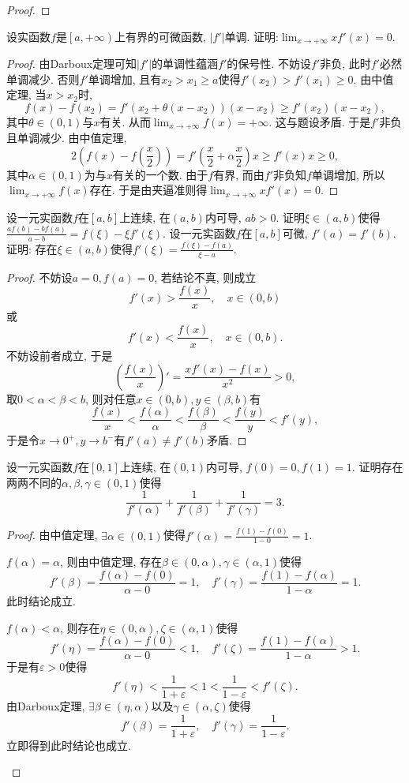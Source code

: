 \begin{quiza}
\begin{proof}
\end{proof}
\woe 设实函数\(f\)是\(\left[a,+\infty\right)\)上有界的可微函数, \(|f'|\)单调. 证明:\(\lim_{x\rightarrow+\infty}xf'(x)=0.\)
\begin{proof}
由Darboux定理可知\(|f'|\)的单调性蕴涵\(f'\)的保号性. 不妨设\(f'\)非负, 此时\(f'\)必然单调减少. 否则\(f'\)单调增加, 且有\(x_2>x_1\geqslant a\)使得\(f'(x_2)>f'(x_1)\geqslant 0\). 由中值定理, 当\(x>x_2\)时,\[f(x)-f(x_2)=f'\left(x_2+\theta (x-x_2)\right)(x-x_2)\geqslant f'(x_2)(x-x_2),\]其中\(\theta\in(0,1)\)与\(x\)有关. 从而\(\lim_{x\rightarrow+\infty}f(x)=+\infty\). 这与题设矛盾. 于是\(f'\)非负且单调减少. 由中值定理,\[2\left(f(x)-f\left(\frac{x}{2}\right)\right)=f'\left(\frac{x}{2}+\alpha\frac{x}{2}\right)x\geqslant f'(x)x\geqslant 0,\]其中\(\alpha\in(0,1)\)为与\(x\)有关的一个数. 由于\(f\)有界, 而由\(f'\)非负知\(f\)单调增加, 所以\(\lim_{x\rightarrow+\infty}f(x)\)存在. 于是由夹逼准则得\(\lim_{x\rightarrow+\infty}xf'(x)=0.\)
\end{proof}
\woe 设一元实函数\(f\)在\([a,b]\)上连续, 在\((a,b)\)内可导, \(ab>0\). 证明\(\xi\in (a,b)\)使得\(\frac{af(b)-bf(a)}{a-b}=f(\xi)-\xi f'(\xi).\)
\woe 设一元实函数\(f\)在\([a,b]\)可微, \(f'(a)=f'(b)\). 证明: 存在\(\xi\in (a,b)\)使得\(f'(\xi)=\frac{f(\xi)-f(a)}{\xi-a}.\)
\begin{proof}
不妨设\(a=0,f(a)=0\), 若结论不真, 则成立\[f'(x)>\frac{f(x)}{x},\quad x\in (0,b)\]或\[f'(x)<\frac{f(x)}{x},\quad x\in (0,b).\]
不妨设前者成立, 于是\[\left(\frac{f(x)}{x}\right)'=\frac{xf'(x)-f(x)}{x^2}>0,\]取\(0<\alpha<\beta<b\), 则对任意\(x\in (0,b),y\in (\beta,b)\)有\[\frac{f(x)}{x}<\frac{f(\alpha)}{\alpha}<\frac{f(\beta)}{\beta}<\frac{f(y)}{y}<f'(y),\]于是令\(x\rightarrow 0^+,y\rightarrow b^-\)有\(f'(a)\ne f'(b)\)矛盾.
\end{proof}
\woe 设一元实函数\(f\)在\([0,1]\)上连续, 在\((0,1)\)内可导, \(f(0)=0,f(1)=1\). 证明存在两两不同的\(\alpha,\beta,\gamma\in (0,1)\)使得\[\frac{1}{f'(\alpha)}+\frac{1}{f'(\beta)}+\frac{1}{f'(\gamma)}=3.\]
\begin{proof}
由中值定理, \(\exists \alpha\in(0,1)\)使得\(f'(\alpha)=\frac{f(1)-f(0)}{1-0}=1\).
\begin{asparaenum}[\textbf{情形}I]
\item \(f(\alpha)=\alpha\), 则由中值定理, 存在\(\beta\in(0,\alpha),\gamma\in(\alpha,1)\)使得\[f'(\beta)=\frac{f(\alpha)-f(0)}{\alpha-0}=1,\quad f'(\gamma)=\frac{f(1)-f(\alpha)}{1-\alpha}=1.\]此时结论成立.
\item \(f(\alpha)<\alpha\), 则存在\(\eta\in(0,\alpha),\zeta\in(\alpha,1)\)使得\[f'(\eta)=\frac{f(\alpha)-f(0)}{\alpha-0}<1,\quad f'(\zeta)=\frac{f(1)-f(\alpha)}{1-\alpha}>1.\]于是有\(\varepsilon>0\)使得\[f'(\eta)<\frac{1}{1+\varepsilon}<1<\frac{1}{1-\varepsilon}<f'(\zeta).\]由Darboux定理, \(\exists\beta\in(\eta,\alpha)\)以及\(\gamma\in(\alpha,\zeta)\)使得\[f'(\beta)=\frac{1}{1+\varepsilon},\quad f'(\gamma)=\frac{1}{1-\varepsilon}.\]立即得到此时结论也成立.

\end{asparaenum}
\end{proof}
\end{quiza}
